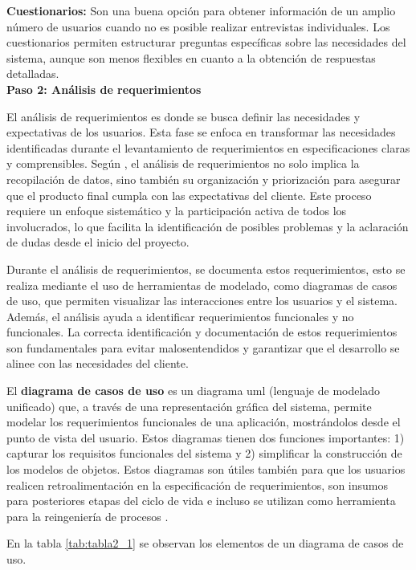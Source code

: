 		\textbf{Cuestionarios:} Son una buena opción para obtener información de un amplio número de usuarios cuando no es posible realizar entrevistas individuales. Los cuestionarios permiten estructurar preguntas específicas sobre las necesidades del sistema, aunque son menos flexibles en cuanto a la obtención de respuestas detalladas.\\
		\textbf{Paso 2: Análisis de requerimientos}
		
		El análisis de requerimientos es donde se busca definir las necesidades y expectativas de los usuarios. Esta fase se enfoca en transformar las necesidades identificadas durante el levantamiento de requerimientos en especificaciones claras y comprensibles. Según \textcite{sommerville2011introduccion}, el análisis de requerimientos no solo implica la recopilación de datos, sino también su organización y priorización para asegurar que el producto final cumpla con las expectativas del cliente. Este proceso requiere un enfoque sistemático y la participación activa de todos los involucrados, lo que facilita la identificación de posibles problemas y la aclaración de dudas desde el inicio del proyecto.
		
		Durante el análisis de requerimientos, se documenta estos requerimientos, esto se realiza mediante el uso de herramientas de modelado, como diagramas de casos de uso, que permiten visualizar las interacciones entre los usuarios y el sistema. Además, el análisis ayuda a identificar requerimientos funcionales y no funcionales. La correcta identificación y documentación de estos requerimientos son fundamentales para evitar malosentendidos y garantizar que el desarrollo se alinee con las necesidades del cliente.
		
		El \textbf{diagrama de casos de uso} es un diagrama uml (lenguaje de modelado unificado) que, a través de una representación gráfica del sistema, permite modelar los requerimientos funcionales de una aplicación, mostrándolos desde el punto de vista del usuario. Estos diagramas tienen dos funciones importantes: 1) capturar los requisitos funcionales del sistema y 2) simplificar la construcción de los modelos de objetos. Estos diagramas son útiles también para que los usuarios realicen retroalimentación en la especificación de requerimientos, son insumos para posteriores etapas del ciclo de vida e incluso se utilizan como herramienta para la reingeniería de procesos \parencite{patino2022ElaDiag}.
		
		En la tabla \ref{tab:tabla2_1} se observan los elementos de un diagrama de casos de uso.
		

